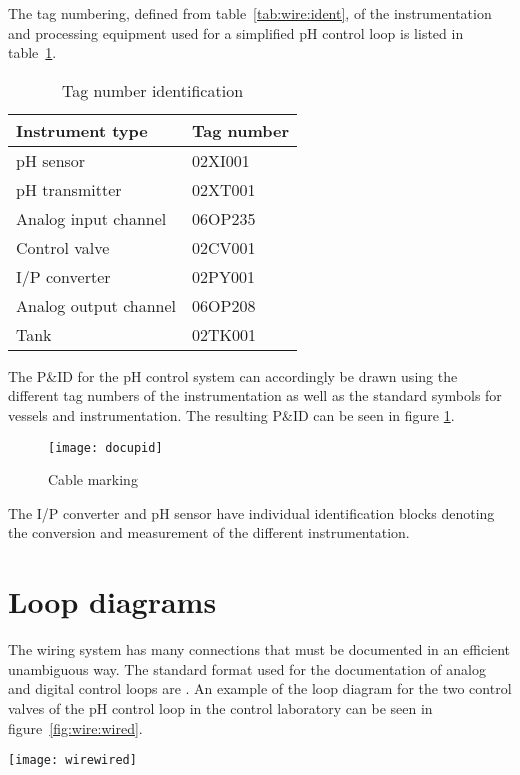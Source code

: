 \begin{example}
	The tag numbering, defined from table~\ref{tab:wire:ident}, of the instrumentation and processing equipment used for a simplified pH control loop is listed in table~\ref{tab:docu:examp}.
	\begin{table}[htbp]
		\centering
		\caption{Tag number identification}
			\begin{tabular}{l l}
			\toprule[1pt]
				Instrument type & Tag number \\
			\midrule[0.5pt]
				pH sensor			  & 02XI001 \\
				pH transmitter  & 02XT001 \\
				Analog input channel & 06OP235\\
				Control valve   & 02CV001 \\
				I/P converter   & 02PY001 \\
				Analog output channel & 06OP208\\
				Tank            & 02TK001 \\
			\bottomrule[1pt]
		\end{tabular}
		\label{tab:docu:examp}
	\end{table}
	
	The P\&ID for the pH control system can accordingly be drawn using the different tag numbers of the 								instrumentation as well as the standard symbols for vessels and instrumentation. The resulting P\&ID can be seen 		in figure \ref{fig:docu:examp}. 
	\begin{figure}[htbp]
		\centering
		\texttt{[image: docupid]}
		\caption{Cable marking}
		\label{fig:docu:examp}
	\end{figure}

	The I/P converter and pH sensor have individual identification blocks denoting the conversion and measurement of 		the different instrumentation.
\end{example}

\section{Loop diagrams}
The wiring system has many connections that must be documented in an efficient unambiguous way. The standard format used for the documentation of analog and digital control loops are \citep[143]{Mulley93}. An example of the loop diagram for the two control valves of the pH control loop in the control laboratory can be seen in figure~\ref{fig:wire:wired}.
\begin{sidewaysfigure}[p]
	\centering
	\texttt{[image: wirewired]}
	\caption{Wire diagram of the control valves of the pH control loop}
	\label{fig:wire:wired}
\end{sidewaysfigure}

